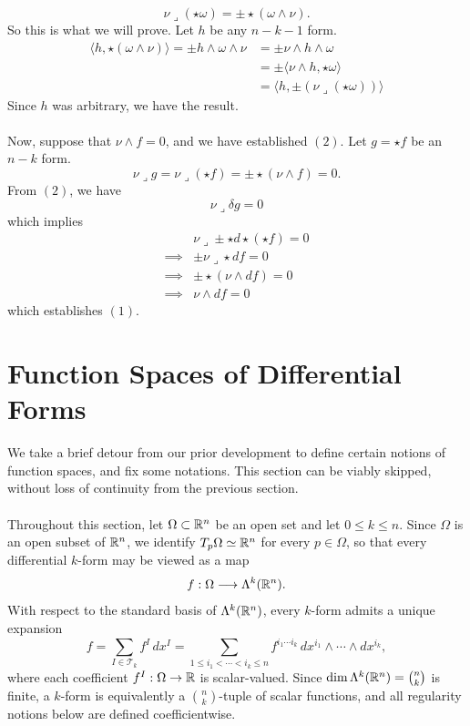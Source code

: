 {\begin{equation}\label{eqn_throwaway-for-nuwedgeomega}
    \nu\lrcorner(\star\omega)=\pm\star(\omega\wedge \nu). 
\end{equation}
So this is what we will prove. Let $h$ be any $n-k-1$ form. \begin{align*}
    \langle h,\star(\omega\wedge \nu)\rangle= \pm h\wedge \omega \wedge \nu &= \pm \nu \wedge h\wedge \omega
    \\ &= \pm\langle \nu\wedge h,\star \omega \rangle \\&=\langle h,\pm (\nu\lrcorner (\star \omega))\rangle
\end{align*}
Since $h$ was arbitrary, we have the result. 
\\\\ Now, suppose that $\nu \wedge f=0$, and we have established $(2)$.
Let $g=\star f$ be an $n-k$ form. $$\nu\lrcorner g =\nu\lrcorner (\star f)=\pm \star (\nu \wedge f)=0. $$
From $(2)$, we have $$\nu \lrcorner \delta g=0$$
which implies \begin{align*}
    &\nu \lrcorner \pm \star d \star (\star f)=0 \\ \implies &\pm\nu \lrcorner \star df=0 \\ \implies &\pm \star (\nu \wedge df)=0 \\ \implies &\nu \wedge df=0  
\end{align*} which establishes $(1)$.
}





\section{Function Spaces of Differential Forms}
\label{sec:function-spaces}
We take a brief detour from our prior development to define certain notions of function spaces, and fix some notations. This section can be viably skipped, without loss of continuity from the previous section.
\\\\ Throughout this section, let $\Omega\subset\mathbb{R}^n$ be an open set and let $0\leq k\leq n$. Since $\Omega$ is an open subset of $\mathbb{R}^n$, we identify $T_p\Omega\simeq\mathbb{R}^n$ for every $p\in\Omega$, so that every differential $k$-form may be viewed as a map
\[
    f:\Omega\longrightarrow\Lambda^k(\mathbb{R}^n).
\]
With respect to the standard basis of $\Lambda^k(\mathbb{R}^n)$, every $k$-form admits a unique expansion
\[
    f
    =
    \sum_{I\in\mathscr T_k} f^I\,dx^I
    =
    \sum_{1\leq i_1<\cdots<i_k\leq n}
    f^{i_1\cdots i_k}\,
    dx^{i_1}\wedge\cdots\wedge dx^{i_k},
\]
where each coefficient $f^I:\Omega\to\mathbb{R}$ is scalar-valued. Since
$\dim\Lambda^k(\mathbb{R}^n)=\binom nk$ is finite, a $k$-form is equivalently a
$\binom nk$-tuple of scalar functions, and all regularity notions below are defined coefficientwise.

